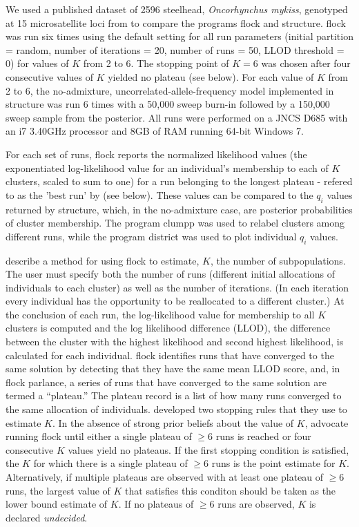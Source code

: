 We used a published dataset of 2596 steelhead, \textit{Oncorhynchus mykiss},
genotyped at 15 microsatellite loci from \citet{Garzaetal_norcal} to compare the programs
{\sc flock} and {\sc structure}.  {\sc flock} 
was run six times using the default setting for all 
run parameters (initial partition = random, number of iterations = 20, number of runs = 50, 
LLOD threshold = 0) for values of $K$ from 2 to 6. The stopping point of 
$K=6$ was chosen after four consecutive values of $K$
yielded no plateau (see below). For each value of $K$ from 2 to 6, the no-admixture, 
uncorrelated-allele-frequency model implemented in {\sc structure} was run 6 times with 
a 50,000 sweep burn-in followed by a 150,000 sweep sample from the posterior. 
All runs were performed on a JNCS D685 with an i7 3.40GHz processor and 8GB
of RAM running 64-bit Windows 7. 

For each set of runs, {\sc flock} reports the 
normalized likelihood values (the exponentiated log-likelihood value for an individual's 
membership to each of $K$ clusters, scaled to sum to one) for a run belonging to the longest plateau - refered to as the 'best run' by \citep{Duc&Tur2012} (see below).
These values can be compared to the $q_i$ values
returned by {\sc structure}, which, in the no-admixture case, are posterior probabilities of cluster membership.
The program {\sc clumpp} \citep{Jak&Ros2007} was used to relabel clusters among different runs,
while the program {\sc district} \citep{Rosenberg2004} was used to plot individual \textit{$q_i$} values. 

\citet{Duc&Tur2012} describe a method for using {\sc flock} to estimate, $K$, the number of
subpopulations. The user must specify both the number of runs (different initial allocations of individuals 
to each cluster) as well as the number of iterations. (In each iteration every individual has the opportunity to be reallocated 
to a different cluster.) At the conclusion of each run, the log-likelihood value for membership to all $K$ clusters is computed
and the log likelihood difference (LLOD), the difference between the cluster with the highest likelihood 
and second highest likelihood, is calculated for each individual. {\sc flock} identifies runs that 
have converged to the same solution by detecting that they have the same mean LLOD score, and, in 
{\sc flock} parlance, a series of runs that have converged to the same solution are termed a ``plateau.'' 
The plateau record is a list of how many runs converged to the same allocation
of individuals. 
\citet{Duc&Tur2012} developed two stopping rules that they use to estimate $K$. In the absence of 
strong prior beliefs about the value of $K$, \citet{Duc&Tur2012} advocate running  {\sc flock} until either a single plateau of
$\geq 6$ runs is reached or four consecutive $K$ values yield no plateaus. If the first stopping condition is satisfied,
the $K$ for which there is a single plateau of $\geq 6$ runs is the point estimate for $K$. Alternatively, 
if multiple plateaus are observed with at least one plateau of $\geq 6$ runs, the largest value of $K$ that satisfies 
this conditon should be taken as the lower bound estimate of $K$. If no plateaus of $\geq 6$ runs are observed, $K$
is declared {\em undecided}.  



